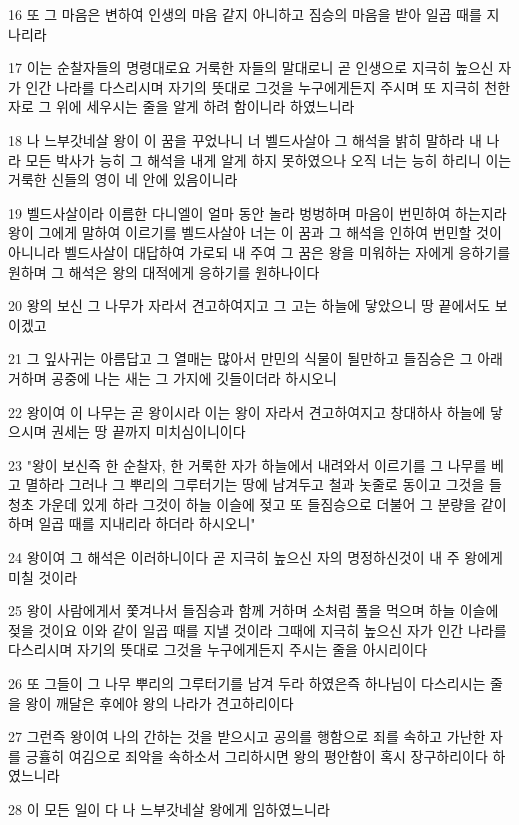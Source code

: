 \par 16 또 그 마음은 변하여 인생의 마음 같지 아니하고 짐승의 마음을 받아 일곱 때를 지나리라
\par 17 이는 순찰자들의 명령대로요 거룩한 자들의 말대로니 곧 인생으로 지극히 높으신 자가 인간 나라를 다스리시며 자기의 뜻대로 그것을 누구에게든지 주시며 또 지극히 천한 자로 그 위에 세우시는 줄을 알게 하려 함이니라 하였느니라
\par 18 나 느부갓네살 왕이 이 꿈을 꾸었나니 너 벨드사살아 그 해석을 밝히 말하라 내 나라 모든 박사가 능히 그 해석을 내게 알게 하지 못하였으나 오직 너는 능히 하리니 이는 거룩한 신들의 영이 네 안에 있음이니라
\par 19 벨드사살이라 이름한 다니엘이 얼마 동안 놀라 벙벙하며 마음이 번민하여 하는지라 왕이 그에게 말하여 이르기를 벨드사살아 너는 이 꿈과 그 해석을 인하여 번민할 것이 아니니라 벨드사살이 대답하여 가로되 내 주여 그 꿈은 왕을 미워하는 자에게 응하기를 원하며 그 해석은 왕의 대적에게 응하기를 원하나이다
\par 20 왕의 보신 그 나무가 자라서 견고하여지고 그 고는 하늘에 닿았으니 땅 끝에서도 보이겠고
\par 21 그 잎사귀는 아름답고 그 열매는 많아서 만민의 식물이 될만하고 들짐승은 그 아래 거하며 공중에 나는 새는 그 가지에 깃들이더라 하시오니
\par 22 왕이여 이 나무는 곧 왕이시라 이는 왕이 자라서 견고하여지고 창대하사 하늘에 닿으시며 권세는 땅 끝까지 미치심이니이다
\par 23 "왕이 보신즉 한 순찰자, 한 거룩한 자가 하늘에서 내려와서 이르기를 그 나무를 베고 멸하라 그러나 그 뿌리의 그루터기는 땅에 남겨두고 철과 놋줄로 동이고 그것을 들 청초 가운데 있게 하라 그것이 하늘 이슬에 젖고 또 들짐승으로 더불어 그 분량을 같이 하며 일곱 때를 지내리라 하더라 하시오니"
\par 24 왕이여 그 해석은 이러하니이다 곧 지극히 높으신 자의 명정하신것이 내 주 왕에게 미칠 것이라
\par 25 왕이 사람에게서 쫓겨나서 들짐승과 함께 거하며 소처럼 풀을 먹으며 하늘 이슬에 젖을 것이요 이와 같이 일곱 때를 지낼 것이라 그때에 지극히 높으신 자가 인간 나라를 다스리시며 자기의 뜻대로 그것을 누구에게든지 주시는 줄을 아시리이다
\par 26 또 그들이 그 나무 뿌리의 그루터기를 남겨 두라 하였은즉 하나님이 다스리시는 줄을 왕이 깨달은 후에야 왕의 나라가 견고하리이다
\par 27 그런즉 왕이여 나의 간하는 것을 받으시고 공의를 행함으로 죄를 속하고 가난한 자를 긍휼히 여김으로 죄악을 속하소서 그리하시면 왕의 평안함이 혹시 장구하리이다 하였느니라
\par 28 이 모든 일이 다 나 느부갓네살 왕에게 임하였느니라

